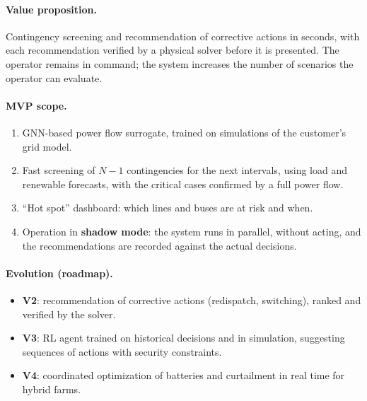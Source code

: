\documentclass[10pt,a4paper,oneside]{article}
\begin{document}
\paragraph{Value proposition.}
Contingency screening and recommendation of corrective actions in seconds,
with each recommendation verified by a physical solver before it is
presented. The operator remains in command; the system increases the number
of scenarios the operator can evaluate.

\paragraph{MVP scope.}
\begin{enumerate}
  \item GNN-based power flow surrogate, trained on simulations of the
    customer's grid model.
  \item Fast screening of $N-1$ contingencies for the next intervals, using
    load and renewable forecasts, with the critical cases confirmed by a
    full power flow.
  \item ``Hot spot'' dashboard: which lines and buses are at risk and when.
  \item Operation in \textbf{shadow mode}: the system runs in parallel,
    without acting, and the recommendations are recorded against the actual
    decisions.
\end{enumerate}

\paragraph{Evolution (roadmap).}
\begin{itemize}
  \item \textbf{V2}: recommendation of corrective actions (redispatch,
    switching), ranked and verified by the solver.
  \item \textbf{V3}: RL agent trained on historical decisions and in
    simulation, suggesting sequences of actions with security constraints.
  \item \textbf{V4}: coordinated optimization of batteries and curtailment
    in real time for hybrid farms.
\end{itemize}
\end{document}
